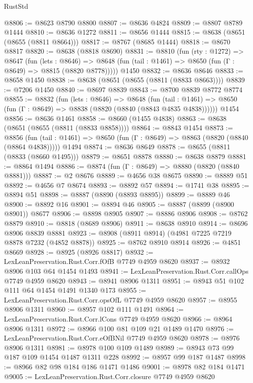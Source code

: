 \begin{lexlean}{RustStd}
\begin{coremodule}
@8806 := @8623 @8790 @8800
@8807 := @8636 @4824
@8809 := @8807 @8789 @1444
@8810 := @8636 @1272
@8811 := @8656 @1444
@8815 := @8638 (@8651 (@8655 (@8811 @8664)))
@8817 := @8767 (@8685 @1444)
@8818 := @8670 @8817
@8820 := @8638 (@8818 @8690)
@8831 := @8810
    (fun (rty : @1272) =>
    @8647
      (fun (lets : @8646) =>
      @8648 (fun (tail : @1461) => @8650 (fun (Γ : @8649) => @8815 (@8820 @8778)))))
    @1450
@8832 := @8636 @8646
@8833 := @8658 @1450
@8838 := @8638 (@8651 (@8655 (@8811 (@8833 @8663))))
@8839 := @7206 @1450
@8840 := @8697 @8839
@8843 := @8700 @8839 @8772 @8774
@8855 := @8832
    (fun (lets : @8646) =>
    @8648
      (fun (tail : @1461) => @8650 (fun (Γ : @8649) => @8838 (@8820 (@8840 (@8843 @4835 @4838))))))
    @1454
@8856 := @8636 @1461
@8858 := @8660 (@1455 @4838)
@8863 := @8638 (@8651 (@8655 (@8811 (@8833 @8858))))
@8864 := @8843 @1454
@8873 := @8856
    (fun (tail : @1461) => @8650 (fun (Γ : @8649) => @8863 (@8820 (@8840 (@8864 @4838)))))
    @1494
@8874 := @8636 @8649
@8878 := @8655 (@8811 (@8833 (@8660 @1495)))
@8879 := @8651 @8878
@8880 := @8638 @8879
@8881 := @8864 @1494
@8886 := @8874 (fun (Γ : @8649) => @8880 (@8820 (@8840 @8881)))
@8887 := @2 @8676
@8889 := @4656 @38 @8675
@8890 := @8889 @51
@8892 := @4656 @7 @8674
@8893 := @8892 @57
@8894 := @1741 @38
@8895 := @8894 @51
@8898 := @8887 (@8890 (@8893 @8895))
@8899 := @8889 @46
@8900 := @8892 @16
@8901 := @8894 @46
@8905 := @8887 (@8899 (@8900 @8901)) @8677
@8906 := @8898 @8905
@8907 := @8886 @8906
@8908 := @8762 @8879
@8910 := @8818 (@8689 @8906)
@8911 := @8638 @8910
@8914 := @8696 @8906 @8839 @8881
@8923 := @8908 (@8911 @8914) (@4981 @7225 @7219 @8878 @7232 (@4852 @8878))
@8925 := @8762 @8910 @8914
@8926 := @4851 @8669
@8928 := @8925 (@8926 @8817)
@8932 := LexLeanPreservation.Rust.Corr.fOfB @7749 @4959 @8620
@8937 := @8932 @8906 @103 @64 @1454 @1493
@8941 := LexLeanPreservation.Rust.Corr.callOps @7749 @4959 @8620
@8943 := @8941 @8906 @1311
@8951 := @8943 @51 @102 @111 @64 @1454 @1491 @1340 @173
@8955 := LexLeanPreservation.Rust.Corr.opsOfL @7749 @4959 @8620
@8957 := @8955 @8906 @1311
@8960 := @8957 @102 @111 @1491
@8964 := LexLeanPreservation.Rust.Corr.lCons @7749 @4959 @8620
@8966 := @8964 @8906 @1311
@8972 := @8966 @100 @81 @109 @21 @1489 @1470
@8976 := LexLeanPreservation.Rust.Corr.eOfBNil @7749 @4959 @8620
@8978 := @8976 @8906 @1311
@8981 := @8978 @100 @109 @1489
@8989 := @8943 @73 @99 @187 @109 @1454 @1487 @1311 @228
@8992 := @8957 @99 @187 @1487
@8998 := @8966 @82 @98 @184 @186 @1471 @1486
@9001 := @8978 @82 @184 @1471
@9005 := LexLeanPreservation.Rust.Corr.closure @7749 @4959 @8620

\end{coremodule}
\end{lexlean}
